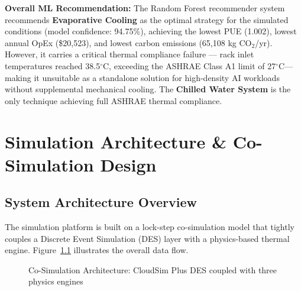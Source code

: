 \documentclass[12pt,a4paper]{report}
\newcommand{\degC}{$^{\circ}$C}
\begin{document}
\noindent\textbf{Overall ML Recommendation:} The Random Forest recommender system recommends
\textbf{Evaporative Cooling} as the optimal strategy for the simulated conditions (model confidence: 94.75\%),
achieving the lowest PUE (1.002), lowest annual OpEx (\$20{,}523), and lowest carbon emissions
(65{,}108 kg CO$_2$/yr). However, it carries a critical thermal compliance failure --- rack inlet
temperatures reached 38.5\degC, exceeding the ASHRAE Class A1 limit of 27\degC --- making it
unsuitable as a standalone solution for high-density AI workloads without supplemental mechanical cooling.
The \textbf{Chilled Water System} is the only technique achieving full ASHRAE thermal compliance.

\newpage

\chapter{Simulation Architecture \& Co-Simulation Design}

\section{System Architecture Overview}

The simulation platform is built on a lock-step co-simulation model that tightly couples a
Discrete Event Simulation (DES) layer with a physics-based thermal engine.
Figure~\ref{fig:cosim_arch} illustrates the overall data flow.

\begin{figure}[H]
\centering
{}
\caption{Co-Simulation Architecture: CloudSim Plus DES coupled with three physics engines}
\label{fig:cosim_arch}
\end{figure}
\end{document}
